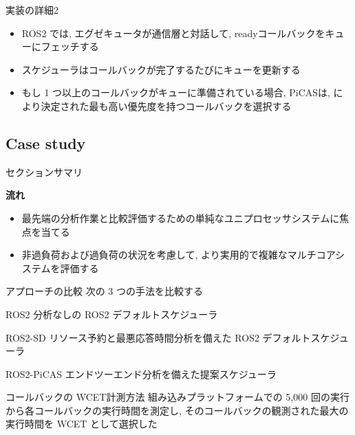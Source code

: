 \begin{frame}{実装の詳細2}
    \begin{itemize}
        \item ROS2 では, エグゼキュータが通信層と対話して, readyコールバックをキューにフェッチする
        \item スケジューラはコールバックが完了するたびにキューを更新する
        \item もし 1 つ以上のコールバックがキューに準備されている場合, PiCASは,  により決定された最も高い優先度を持つコールバックを選択する
    \end{itemize}
\end{frame}


\subsection{Case study}
\label{ssec: case study}

\begin{frame}{セクションサマリ}
    \begin{itembox}[l]{\textbf{流れ}}
        \begin{itemize}
            \item 最先端の分析作業と比較評価するための単純なユニプロセッサシステムに焦点を当てる
            \item 非過負荷および過負荷の状況を考慮して, より実用的で複雑なマルチコアシステムを評価する
        \end{itemize}
    \end{itembox}
\end{frame}

\begin{frame}{アプローチの比較}
    次の 3 つの手法を比較する
    \begin{block}{ROS2}
        分析なしの ROS2 デフォルトスケジューラ
    \end{block}
    \begin{block}{ROS2-SD}
        リソース予約と最悪応答時間分析を備えた ROS2 デフォルトスケジューラ~\cite{casini2019response}
    \end{block}
    \begin{block}{ROS2-PiCAS}
        エンドツーエンド分析を備えた提案スケジューラ
    \end{block}
\end{frame}

\begin{frame}{コールバックの WCET計測方法}
    組み込みプラットフォームでの 5,000 回の実行から各コールバックの実行時間を測定し, そのコールバックの観測された最大の実行時間を WCET として選択した
\end{frame}

